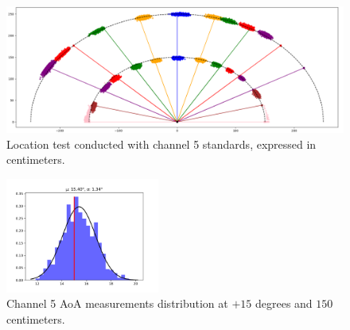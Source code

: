 \begin{figure}
    \centering
    \includegraphics[width=1.0\textwidth]{images/characterization/ch5_characterization.png}
    \caption{Location test conducted with channel 5 standards, expressed in centimeters.}
    \label{UWB:fig:ch5test}
\end{figure}

\begin{figure}
    \centering
    \includegraphics[width=0.45\textwidth]{images/characterization/ch5_aoa_hist.png}
    \caption{Channel 5 AoA measurements distribution at $+15$ degrees and $150$ centimeters.}
    \label{UWB:fig:AoA_ch5}
\end{figure}

